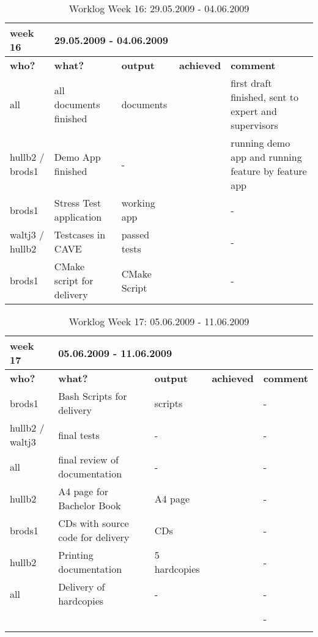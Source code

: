 \begin{table}[H]
	\centering
	\begin{tabular}{|b{}|p{}|p{}|p{}|p{}|}
		\hline \bfseries week 16 & \multicolumn{4}{l|}{\bfseries 29.05.2009 - 04.06.2009} \\
		\hline
		\hline \bfseries who? & \bfseries what? & \bfseries output & \bfseries achieved & \bfseries comment \\ 
		\hline all & all documents finished & documents & \quad\quad\color{yellow}{\bfseries !} & first draft finished, sent to expert and supervisors \\
		\hline hullb2 / brods1 & Demo App finished & \quad\quad- & \tick & running demo app and running feature by feature app \\
		\hline brods1 & Stress Test application & working app & \tick & \quad\quad- \\
		\hline waltj3 / hullb2 & Testcases in CAVE & passed tests & \tick & \quad\quad- \\
		\hline brods1 & CMake script for delivery & CMake Script & \tick & \quad\quad- \\
		\hline
	\end{tabular}
	\caption{Worklog Week 16: 29.05.2009 - 04.06.2009}
\end{table}


\begin{table}[H]
	\centering
	\begin{tabular}{|b{}|p{}|p{}|p{}|p{}|}
		\hline \bfseries week 17 & \multicolumn{4}{l|}{\bfseries 05.06.2009 - 11.06.2009} \\
		\hline
		\hline \bfseries who? & \bfseries what? & \bfseries output & \bfseries achieved & \bfseries comment \\ 
		\hline brods1 & Bash Scripts for delivery & scripts & \tick & \quad\quad- \\
		\hline hullb2 / waltj3 & final tests & \quad\quad- & \tick & \quad\quad- \\
		\hline all & final review of documentation & \quad\quad- & \tick & \quad\quad- \\
		\hline hullb2 & A4 page for Bachelor Book & A4 page & \tick & \quad\quad- \\
		\hline brods1 & CDs with source code for delivery & CDs & \tick & \quad\quad- \\
		\hline hullb2 & Printing documentation & 5 hardcopies & \tick & \quad\quad- \\
		\hline all & Delivery of hardcopies & \quad\quad- & \tick & \quad\quad- \\
		\hline
		\hline \color{red}{\bfseries M4} & \multicolumn{2}{l|}{\color{red}{\bfseries Tests finished}} & \tick & \quad\quad- \\
		\hline
		\hline \multicolumn{2}{|l|}{\color{red}{\bfseries 16.02.2009}} & \multicolumn{3}{l|}{\color{red}{\bfseries Project End}} \\
		\hline
	\end{tabular}
	\caption{Worklog Week 17: 05.06.2009 - 11.06.2009}
\end{table}

